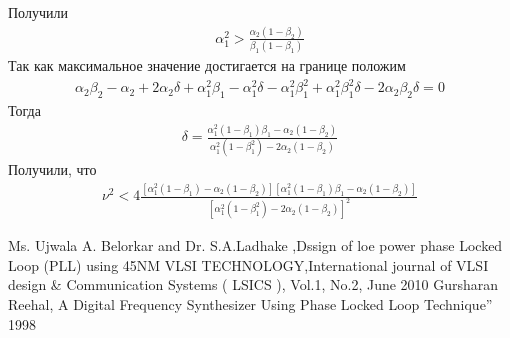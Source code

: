 \documentclass[a4paper,14pt]{extarticle} %
\begin{document}
Получили
 \begin{equation}
 \begin{aligned}
\alpha_1^2 > \frac{\alpha_2(1-\beta_2)}{\beta_1(1-\beta_1)}
 \end{aligned}
\end{equation}
Так как максимальное значение достигается на границе положим 
 \begin{equation}
 \begin{aligned}
\alpha_2\beta_2 - \alpha_2 + 2\alpha_2\delta + \alpha_1^2\beta_1 - \alpha_1^2\delta - \alpha_1^2\beta_1^2 + \alpha_1^2\beta_1^2\delta - 2\alpha_2\beta_2\delta = 0
 \end{aligned}
\end{equation}
Тогда 
 \begin{equation}
 \begin{aligned}
\delta = \frac{\alpha_1^2(1-\beta_1)\beta_1 - \alpha_2(1-\beta_2)}{\alpha_1^2(1-\beta_1^2) - 2\alpha_2(1-\beta_2)}
 \end{aligned}
 \end{equation}
Получили, что
 \begin{equation}
 \begin{aligned}
\nu^2 < 4\frac{[\alpha_1^2(1-\beta_1) - \alpha_2(1-\beta_2)][\alpha_1^2(1-\beta_1)\beta_1 - \alpha_2(1-\beta_2)]}{[\alpha_1^2(1-\beta_1^2) - 2\alpha_2(1-\beta_2)]^2}
 \end{aligned}
 \end{equation}
 \cite{Vshivkov}
 \nocite{LiuLiu}

\newpage
\begin{thebibliography}{3}
Ms. Ujwala A. Belorkar  and Dr. S.A.Ladhake ,Dssign of loe power phase Locked Loop (PLL) using 45NM VLSI  TECHNOLOGY,International  journal of  VLSI  design  \&  Communication  Systems (  LSICS  ), Vol.1, No.2, June 2010
Gursharan Reehal, A Digital Frequency Synthesizer Using Phase Locked Loop Technique” 1998
\end{thebibliography}
\end{document}
